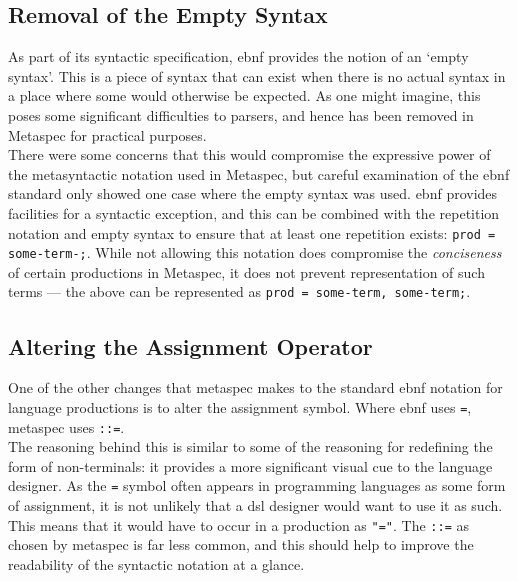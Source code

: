 \subsection{Removal of the Empty Syntax} %
\label{sub:removal_of_the_empty_syntax}
As part of its syntactic specification, \gls{ebnf} provides the notion of an `empty syntax'.
This is a piece of syntax that can exist when there is no actual syntax in a place where some would otherwise be expected. 
As one might imagine, this poses some significant difficulties to parsers, and hence has been removed in Metaspec for practical purposes. \\

There were some concerns that this would compromise the expressive power of the metasyntactic notation used in Metaspec, but careful examination of the \gls{ebnf} standard only showed one case where the empty syntax was used. 
\gls{ebnf} provides facilities for a syntactic exception, and this can be combined with the repetition notation and empty syntax to ensure that at least one repetition exists: \texttt{prod = {some-term}-;}.
While not allowing this notation does compromise the \textit{conciseness} of certain productions in Metaspec, it does not prevent representation of such terms --- the above can be represented as \texttt{prod = some-term, {some-term};}.


\subsection{Altering the Assignment Operator} %
\label{sub:altering_the_assignment_operator}
One of the other changes that \gls{metaspec} makes to the standard \gls{ebnf} notation for language productions is to alter the assignment symbol.
Where \gls{ebnf} uses \texttt{=}, \gls{metaspec} uses \texttt{::=}.\\

The reasoning behind this is similar to some of the reasoning for redefining the form of non-terminals: it provides a more significant visual cue to the language designer. 
As the \texttt{=} symbol often appears in programming languages as some form of assignment, it is not unlikely that a \gls{dsl} designer would want to use it as such.
This means that it would have to occur in a production as \texttt{"="}. 
The \texttt{::=} as chosen by \gls{metaspec} is far less common, and this should help to improve the readability of the syntactic notation at a glance. 

